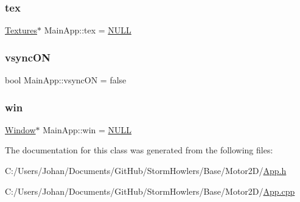\mbox{\label{class_main_app_a16ce0e1da421d3e91aec508bd6fb205e}} 
\subsubsection{\texorpdfstring{tex}{tex}}
{\footnotesize\ttfamily \mbox{\hyperlink{class_textures}{Textures}}$\ast$ Main\+App\+::tex = \mbox{\hyperlink{_defs_8h_a070d2ce7b6bb7e5c05602aa8c308d0c4}{N\+U\+LL}}}

\mbox{\label{class_main_app_abfd84f18aeef355427230f1e43f2d3c9}} 
\subsubsection{\texorpdfstring{vsyncON}{vsyncON}}
{\footnotesize\ttfamily bool Main\+App\+::vsync\+ON = false}

\mbox{\label{class_main_app_a7cc625840e9468586754c26af6712479}} 
\subsubsection{\texorpdfstring{win}{win}}
{\footnotesize\ttfamily \mbox{\hyperlink{class_window}{Window}}$\ast$ Main\+App\+::win = \mbox{\hyperlink{_defs_8h_a070d2ce7b6bb7e5c05602aa8c308d0c4}{N\+U\+LL}}}



The documentation for this class was generated from the following files\+:\begin{DoxyCompactItemize}
\item 
C\+:/\+Users/\+Johan/\+Documents/\+Git\+Hub/\+Storm\+Howlers/\+Base/\+Motor2\+D/\mbox{\hyperlink{_app_8h}{App.\+h}}\item 
C\+:/\+Users/\+Johan/\+Documents/\+Git\+Hub/\+Storm\+Howlers/\+Base/\+Motor2\+D/\mbox{\hyperlink{_app_8cpp}{App.\+cpp}}\end{DoxyCompactItemize}

